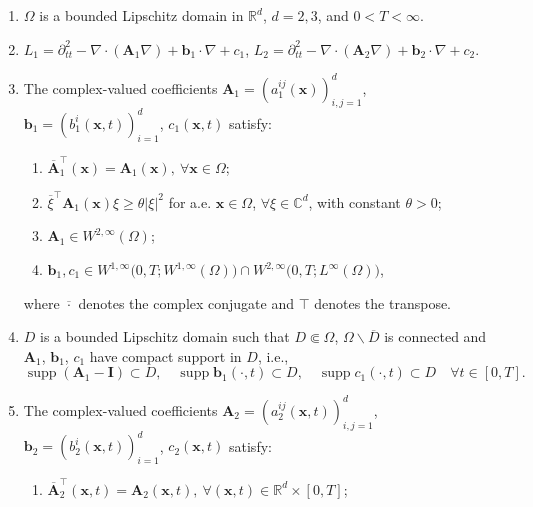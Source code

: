 \documentclass[11pt,reqno,oneside]{amsart}
\numberwithin{equation}{section}
\theoremstyle{definition}
\theoremstyle{remark}
\numberwithin{equation}{section}
\begin{document}
	\begin{enumerate}
		\item $\Omega$ is a bounded Lipschitz domain in $\mathbb{R}^d$, $d=2, 3$, and $0<T<\infty$.
		
		\item $L_1=\partial_{tt}^2  - \nabla \cdot (\mathbf{A}_1\nabla ) + \mathbf{b}_1\cdot \nabla  + c_1$, $L_2=\partial_{tt}^2  - \nabla \cdot (\mathbf{A}_2\nabla ) + \mathbf{b}_2\cdot \nabla  + c_2$.
		
		\item The complex-valued coefficients $\mathbf{A}_1 = (a_1^{ij}(\mathbf{x}))_{i,j=1}^d$, $\mathbf{b}_1= (b_1^i(\mathbf{x},t))_{i=1}^d$, $c_1(\mathbf{x},t)$ satisfy:
		\begin{enumerate}
			\item $\overline{\mathbf{A}}_1^{\top} \! (\mathbf{x}) = \mathbf{A}_1(\mathbf{x}), ~\forall \mathbf{x} \in \Omega$;
			
			\item $\overline{\xi}^{\top} \mathbf{A}_1(\mathbf{x}) \xi \geq \theta \lvert \xi \rvert^{2}$ for a.e. $\mathbf{x} \in \Omega$, $\forall \xi \in \mathbb{C}^d$, with constant $\theta > 0$;
			
			\item $\mathbf{A}_1\in W^{2,\infty}(\Omega)$;
			
			\item $\mathbf{b}_1, c_1 \in W^{1,\infty}\big(0,T; W^{1,\infty}(\Omega)\big) \cap W^{2,\infty}\big(0,T; L^{\infty}(\Omega)\big)$,
		\end{enumerate}
		where $\overline{\cdot}$ denotes the complex conjugate and $\top$ denotes the transpose.
		
		\item $D$ is a bounded Lipschitz domain such that $D\Subset\Omega$, $\Omega \backslash \overline{D}$ is connected and  $\mathbf{A}_1$, $\mathbf{b}_1$, $c_1$ have compact support in $D$, i.e.,
		\begin{equation*}\label{compact support}
			\operatorname{supp}(\mathbf{A}_1 - \mathbf{I}) \subset D,\quad
			\operatorname{supp} \mathbf{b}_1(\cdot,t) \subset D,\quad
			\operatorname{supp} c_1(\cdot,t) \subset D \quad \forall t \in [0,T].
		\end{equation*}
		
		\item The complex-valued coefficients $\mathbf{A}_2 = (a_2^{ij}(\mathbf{x},t))_{i,j=1}^d$, $\mathbf{b}_2= (b_2^i(\mathbf{x},t))_{i=1}^d$, $c_2(\mathbf{x},t)$ satisfy:
		\begin{enumerate}
			\item $\overline{\mathbf{A}}_2^{\top} \! (\mathbf{x},t) = \mathbf{A}_2(\mathbf{x},t), ~\forall (\mathbf{x},t) \in \mathbb{R}^d\times [0,T]$;
			

\end{enumerate}
\end{enumerate}
\end{document}
